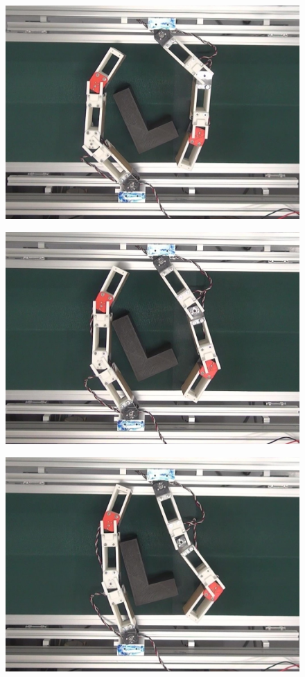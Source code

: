 \documentclass[a4paper,twoside,12pt,papersize, dvipdfmx]{iirthesis}
\begin{document}
\begin{figure}[b]
\centering
\begin{minipage}{0.249\hsize}
\centering
\includegraphics[width=0.98\hsize]{fig/4-manipulation-result/LShape/1-1.jpg}
\subcaption{}\label{}
\end{minipage}\hfill
\begin{minipage}{0.249\hsize}
\centering
\includegraphics[width=0.98\hsize]{fig/4-manipulation-result/LShape/1-2.jpg}
\subcaption{}\label{}
\end{minipage}\hfill
\begin{minipage}{0.249\hsize}
\centering
\includegraphics[width=0.98\hsize]{fig/4-manipulation-result/LShape/1-3.jpg}

\end{minipage}
\end{figure}
\end{document}
